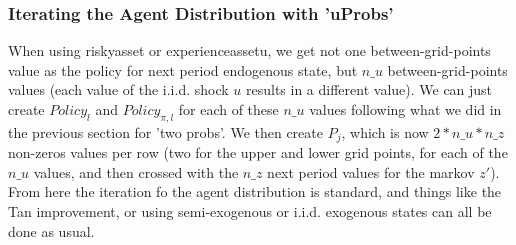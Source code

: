 \subsubsection{Iterating the Agent Distribution with 'uProbs'}
When using riskyasset or experienceassetu, we get not one between-grid-points value as the policy for next period endogenous state, but $n\_{}u$ between-grid-points values (each value of the i.i.d. shock $u$ results in a different value). We can just create $Policy_l$ and $Policy_{\pi,l}$ for each of these $n\_{}u$ values following what we did in the previous section for 'two probs'. We then create $P_j$, which is now $2*n\_u{}*n\_{}z$ non-zeros values per row (two for the upper and lower grid points, for each of the $n\_{}u$ values, and then crossed with the $n\_{}z$ next period values for the markov $z'$). From here the iteration fo the agent distribution is standard, and things like the Tan improvement, or using semi-exogenous or i.i.d. exogenous states can all be done as usual.

